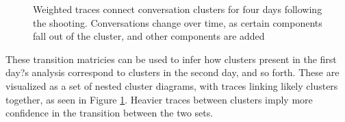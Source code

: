 \documentclass[12pt]{article}
\begin{document}
\begin{figure}[!ht]

    \caption{Weighted  traces  connect  conversation  clusters  for  four  days  following  the  shooting. Conversations change over time, as certain components fall out of the cluster, and other components are added}
  \label{fig:multi_day_cluster}
\end{figure}

These transition matricies can be used to infer how clusters present in the first day?s analysis correspond to clusters in the second day, and so forth. These are visualized as a set of nested cluster diagrams, with traces linking likely clusters together, as seen in Figure \ref{fig:multi_day_cluster}. Heavier traces between clusters imply more confidence in the transition between the two sets.
\end{document}
